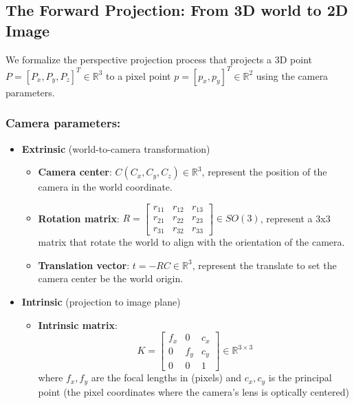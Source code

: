 \documentclass[12pt]{article}
\begin{document}
\newpage

\subsection{The Forward Projection: From 3D world to 2D Image}
We formalize the perspective projection process that projects a 3D point $P=[P_x,P_y,P_z]^T \in \mathbb{R}^3$ to a pixel point $p=[p_x,p_y]^T \in \mathbb{R}^2$ using the camera parameters.
\subsubsection*{Camera parameters:}
\begin{itemize}
    \item \textbf{Extrinsic} (world-to-camera transformation)
        \begin{itemize}
            \item \textbf{Camera center}: $C(C_x, C_y, C_z) \in \mathbb{R}^3$, represent the position of the camera in the world coordinate.
            \item \textbf{Rotation matrix}: $R = 
                \begin{bmatrix}
                    r_{11} & r_{12} & r_{13} \\
                    r_{21} & r_{22} & r_{23} \\
                    r_{31} & r_{32} & r_{33}
                \end{bmatrix}
                \in SO(3)$, represent a 3x3 matrix that rotate the world to align with the orientation of the camera.
            \item \textbf{Translation vector}: $t = -RC \in \mathbb{R}^3$, represent the translate to set the camera center be the world origin.
        \end{itemize}
    \item \textbf{Intrinsic} (projection to image plane)
        \begin{itemize}
            \item \textbf{Intrinsic matrix}: 
                \[
                    K = \begin{bmatrix}
                    f_x & 0 & c_x \\
                    0 & f_y & c_y \\
                    0 & 0 & 1
                    \end{bmatrix} \in \mathbb{R}^{3 \times 3}
                \]
            where \(f_x, f_y\) are the focal lengths in (pixels) and \(c_x, c_y\) is the principal point (the pixel coordinates where the camera's lens is optically centered)
        \end{itemize}
\end{itemize}
\end{document}
